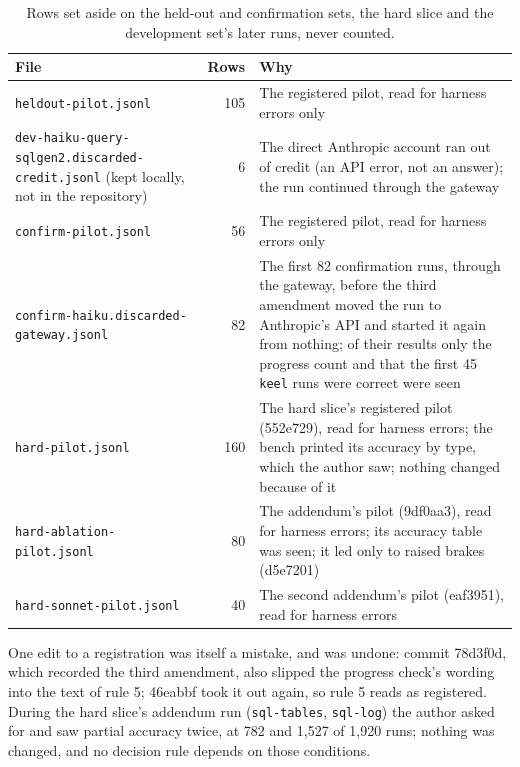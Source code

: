 \documentclass[sigconf, nonacm]{acmart}
\newcommand{\code}[1]{\texttt{#1}}
\begin{document}
\begin{table}[t]
\caption{Rows set aside on the held-out and confirmation sets, the hard slice and the development set's later runs, never counted.}
\label{tab:aside}
\centering
\footnotesize
\begin{tabularx}{\textwidth}{P{1.6in} r L}
\toprule
File & Rows & Why \\
\midrule
\code{heldout-pilot.jsonl} & 105 & The registered pilot, read for harness errors only \\
\code{dev-haiku-query-sqlgen2.discarded-credit.jsonl} (kept locally, not in the repository) & 6 & The direct Anthropic account ran out of credit (an API error, not an answer); the run continued through the gateway \\
\code{confirm-pilot.jsonl} & 56 & The registered pilot, read for harness errors only \\
\code{confirm-haiku.discarded-gateway.jsonl} & 82 & The first 82 confirmation runs, through the gateway, before the third amendment moved the run to Anthropic's API and started it again from nothing; of their results only the progress count and that the first 45 \code{keel} runs were correct were seen \\
\code{hard-pilot.jsonl} & 160 & The hard slice's registered pilot (552e729), read for harness errors; the bench printed its accuracy by type, which the author saw; nothing changed because of it \\
\code{hard-ablation-pilot.jsonl} & 80 & The addendum's pilot (9df0aa3), read for harness errors; its accuracy table was seen; it led only to raised brakes (d5e7201) \\
\code{hard-sonnet-pilot.jsonl} & 40 & The second addendum's pilot (eaf3951), read for harness errors \\
\bottomrule
\end{tabularx}
\end{table}

One edit to a registration was itself a mistake, and was undone: commit 78d3f0d, which recorded the third amendment, also slipped the progress check's wording into the text of rule 5; 46eabbf took it out again, so rule 5 reads as registered. During the hard slice's addendum run (\code{sql-tables}, \code{sql-log}) the author asked for and saw partial accuracy twice, at 782 and 1,527 of 1,920 runs; nothing was changed, and no decision rule depends on those conditions.

\clearpage
\end{document}
